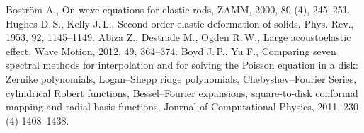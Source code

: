 \documentclass[12pt, a4paper]{report}
\begin{document}
\begin{thebibliography}{99}
	 Bostr\"{o}m A., On wave equations for elastic rods, ZAMM, 2000, 80 (4), 245--251. 
	 Hughes D.\,S., Kelly J.\,L., Second order elastic deformation of solids, Phys. Rev., 1953, 92,  1145--1149.
	 Abiza Z., Destrade M., Ogden R.\,W., Large acoustoelastic effect, Wave Motion, 2012, 49, 364--374.
	 Boyd J.\,P., Yu F., Comparing seven spectral methods for interpolation and for solving the Poisson equation in a disk: Zernike polynomials, Logan–Shepp ridge polynomials, Chebyshev–Fourier Series, cylindrical Robert functions, Bessel–Fourier expansions, square-to-disk conformal mapping and radial basis functions, Journal of Computational Physics, 2011, 230\,(4) 1408--1438.
\end{thebibliography}
\end{document}
